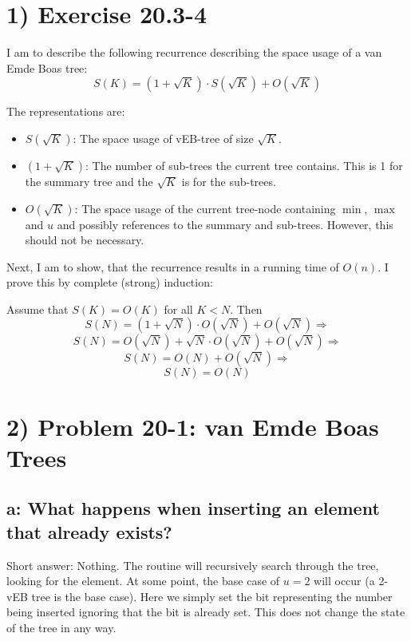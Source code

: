 \documentclass[10pt,oneside,a4paper,final,english]{memoir}
\begin{document}

\newcommand{\ct}{\texttt}


\maketitle
\newpage


\section*{1) Exercise 20.3-4}
I am to describe the following recurrence describing the space usage
of a van Emde Boas tree:
\[S(K) = (1 + \sqrt{K})\cdot S(\sqrt{K}) + O(\sqrt{K})\]

The representations are:
\begin{itemize}
\item $S(\sqrt{K})$: The space usage of vEB-tree of size $\sqrt{K}$.
\item $(1+\sqrt{K})$: The number of sub-trees the current tree
  contains. This is 1 for the summary tree and the $\sqrt{K}$ is for
  the sub-trees.
\item $O(\sqrt{K})$: The space usage of the current tree-node
  containing $\min$, $\max$ and $u$ and possibly references to the
  summary and sub-trees. However, this should not be necessary.
\end{itemize}

Next, I am to show, that the recurrence results in a running time of
$O(n)$. I prove this by complete (strong) induction:

Assume that $S(K) = O(K)$ for all $K < N$. Then
\[ S(N) = (1 + \sqrt{N}) \cdot O(\sqrt{N}) + O(\sqrt{N}) \Rightarrow \]
\[ S(N) = O(\sqrt{N}) + \sqrt{N}\cdot O(\sqrt{N}) + O(\sqrt{N})
\Rightarrow \]
\[ S(N) = O(N) + O(\sqrt{N}) \Rightarrow \]
\[ S(N) = O(N) \]



\section*{2) Problem 20-1: van Emde Boas Trees}
\subsection{a: What happens when inserting an element that already
  exists?}
Short answer: Nothing. The routine will recursively search through the
tree, looking for the element. At some point, the base case of $u
= 2$ will occur (a 2-vEB tree is the base case). Here we simply set
the bit representing the number being inserted ignoring that the bit
is already set. This does not change the state of the tree in any way.
\end{document}

